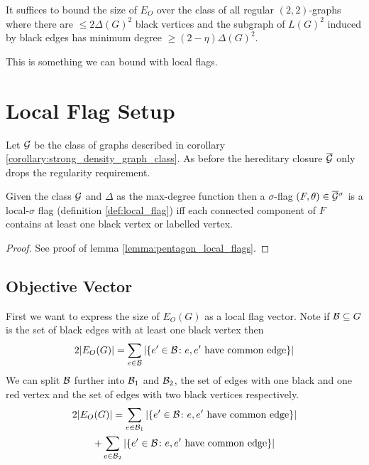 \begin{corollary}
    \label{corollary:strong_density_graph_class}
    It suffices to bound the size of $E_O$
    over the class of all regular $(2,2)$-graphs where there are $\leq 2\Delta(G)^2$ black
    vertices and the subgraph of $L(G)^2$ induced by black edges has minimum
    degree $\geq (2-\eta)\Delta(G)^2$.
\end{corollary}

This is something we can bound with local flags.

\section{Local Flag Setup}

Let $\mathcal{G}$ be the class of graphs described in corollary \ref{corollary:strong_density_graph_class}.
As before the hereditary closure $\overline{\mathcal{G}}$ only drops the regularity requirement.

\begin{lemma}
    Given the class $\mathcal{G}$ and $\Delta$ as the max-degree function then a
    $\sigma$-flag $(F, \theta)\in \overline{\mathcal{G}}{}^\sigma$ is a local-$\sigma$ flag (definition
    \ref{def:local_flag}) iff
    each connected component of $F$ contains at least one black vertex or labelled vertex.
\end{lemma}

\begin{proof}
    See proof of lemma \ref{lemma:pentagon_local_flags}.
\end{proof}

\subsection{Objective Vector}
\label{sec:sec_obj_vector}

First we want to express the size of $E_O(G)$ as a local flag vector.
Note if $\mathcal{B}\subseteq G$ is the set of black edges with at least one black vertex then
\[
    2|E_O(G)| = \sum_{e \in \mathcal{B}}|\{e' \in \mathcal{B} \colon e, e'\ \text{have common edge}\}|
\]
We can split $\mathcal{B}$ further into $\mathcal{B}_1$ and $\mathcal{B}_2$, the set of edges with one
black and one red vertex and the set of edges with two black vertices respectively.
\begin{multline*}
    2|E_O(G)| = \sum_{e \in \Bcl_1}|\{e' \in \Bcl \colon e, e'\ \text{have common edge}\}|\\
    +  \sum_{e \in \Bcl_2}|\{e' \in \Bcl \colon e, e'\ \text{have common edge}\}|
\end{multline*}

